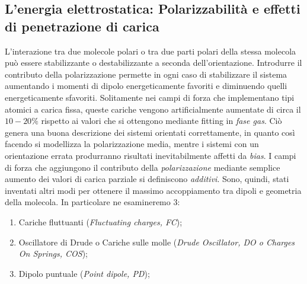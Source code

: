 \documentclass[oneside]{amsbook}
\numberwithin{section}{chapter}
\numberwithin{equation}{section}
\numberwithin{figure}{section}
\begin{document}
\subsection{L'energia elettrostatica: Polarizzabilità e effetti di penetrazione di carica}\label{ee3}
L'interazione tra due molecole polari o tra due parti polari  della stessa molecola può essere stabilizzante o destabilizzante a seconda dell'orientazione.
Introdurre il contributo della polarizzazione permette in ogni caso di stabilizzare il sistema aumentando i momenti di dipolo energeticamente favoriti e diminuendo quelli energeticamente sfavoriti.
Solitamente nei campi di forza che implementano tipi atomici a carica fissa, queste cariche vengono artificialmente aumentate di circa il $10-20 \%$ rispetto ai valori che si ottengono mediante fitting in \emph{fase gas}. Ciò genera una buona descrizione dei sistemi orientati correttamente, in quanto così facendo si modellizza la polarizzazione media, mentre i sistemi con un orientazione errata produrranno risultati inevitabilmente affetti da 	\emph{bias}. I campi di forza che aggiungono il contributo della \emph{polarizzazione} mediante semplice aumento dei valori di carica parziale si definiscono \emph{additivi}.
Sono, quindi, stati inventati altri modi per ottenere il massimo accoppiamento tra dipoli e geometria della molecola. In particolare ne esamineremo $3$:
\begin{enumerate}
\item Cariche fluttuanti (\textit{Fluctuating charges, FC});
\item Oscillatore di Drude o Cariche sulle molle  (\textit{Drude Oscillator, DO o Charges On Springs, COS});
\item Dipolo puntuale (\textit{Point dipole, PD});
\end{enumerate}
\end{document}
